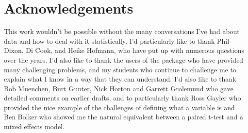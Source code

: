 \documentclass[article]{jss}
\begin{document}

\section{Acknowledgements} 
\label{sec:acknowledgements}

This work wouldn't be possible without the many conversations I've had about data and how to deal with it statistically. I'd particularly like to thank Phil Dixon, Di Cook, and Heike Hofmann, who have put up with numerous questions over the years. I'd also like to thank the users of the  package who have provided many challenging problems, and my students who continue to challenge me to explain what I know in a way that they can understand. I'd also like to thank Bob Muenchen, Burt Gunter, Nick Horton and Garrett Grolemund who gave detailed comments on earlier drafts, and to particularly thank Ross Gayler who provided the nice example of the challenges of defining what a variable is and Ben Bolker who showed me the natural equivalent between a paired t-test and a mixed effects model.


\end{document}
